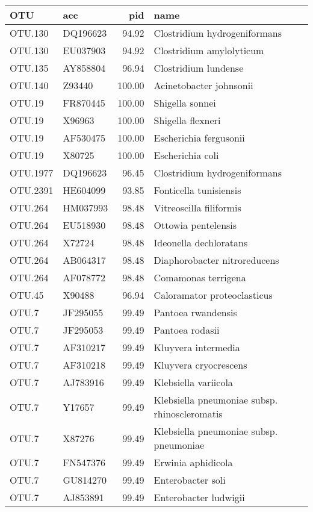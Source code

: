 \begin{tabular}{llrl}
  \hline
OTU & acc & pid & name \\ 
  \hline
  OTU.130 & DQ196623 & 94.92 & Clostridium hydrogeniformans \\ 
  OTU.130 & EU037903 & 94.92 & Clostridium amylolyticum \\ 
  OTU.135 & AY858804 & 96.94 & Clostridium lundense \\ 
  OTU.140 & Z93440 & 100.00 & Acinetobacter johnsonii \\ 
  OTU.19 & FR870445 & 100.00 & Shigella sonnei \\ 
  OTU.19 & X96963 & 100.00 & Shigella flexneri \\ 
  OTU.19 & AF530475 & 100.00 & Escherichia fergusonii \\ 
  OTU.19 & X80725 & 100.00 & Escherichia coli \\ 
  OTU.1977 & DQ196623 & 96.45 & Clostridium hydrogeniformans \\ 
  OTU.2391 & HE604099 & 93.85 & Fonticella tunisiensis \\ 
  OTU.264 & HM037993 & 98.48 & Vitreoscilla filiformis \\ 
  OTU.264 & EU518930 & 98.48 & Ottowia pentelensis \\ 
  OTU.264 & X72724 & 98.48 & Ideonella dechloratans \\ 
  OTU.264 & AB064317 & 98.48 & Diaphorobacter nitroreducens \\ 
  OTU.264 & AF078772 & 98.48 & Comamonas terrigena \\ 
  OTU.45 & X90488 & 96.94 & Caloramator proteoclasticus \\ 
  OTU.7 & JF295055 & 99.49 & Pantoea rwandensis \\ 
  OTU.7 & JF295053 & 99.49 & Pantoea rodasii \\ 
  OTU.7 & AF310217 & 99.49 & Kluyvera intermedia \\ 
  OTU.7 & AF310218 & 99.49 & Kluyvera cryocrescens \\ 
  OTU.7 & AJ783916 & 99.49 & Klebsiella variicola \\ 
  OTU.7 & Y17657 & 99.49 & Klebsiella pneumoniae subsp. rhinoscleromatis \\ 
  OTU.7 & X87276 & 99.49 & Klebsiella pneumoniae subsp. pneumoniae \\ 
  OTU.7 & FN547376 & 99.49 & Erwinia aphidicola \\ 
  OTU.7 & GU814270 & 99.49 & Enterobacter soli \\ 
  OTU.7 & AJ853891 & 99.49 & Enterobacter ludwigii \\ 

\end{tabular}
